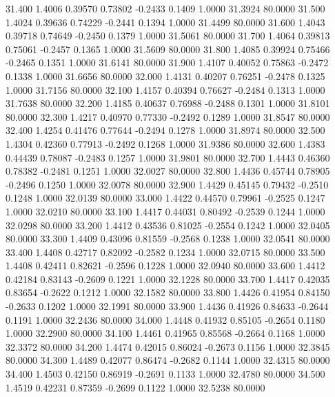   31.400   1.4006   0.39570   0.73802  -0.2433   0.1409   1.0000  31.3924  80.0000
  31.500   1.4024   0.39636   0.74229  -0.2441   0.1394   1.0000  31.4499  80.0000
  31.600   1.4043   0.39718   0.74649  -0.2450   0.1379   1.0000  31.5061  80.0000
  31.700   1.4064   0.39813   0.75061  -0.2457   0.1365   1.0000  31.5609  80.0000
  31.800   1.4085   0.39924   0.75466  -0.2465   0.1351   1.0000  31.6141  80.0000
  31.900   1.4107   0.40052   0.75863  -0.2472   0.1338   1.0000  31.6656  80.0000
  32.000   1.4131   0.40207   0.76251  -0.2478   0.1325   1.0000  31.7156  80.0000
  32.100   1.4157   0.40394   0.76627  -0.2484   0.1313   1.0000  31.7638  80.0000
  32.200   1.4185   0.40637   0.76988  -0.2488   0.1301   1.0000  31.8101  80.0000
  32.300   1.4217   0.40970   0.77330  -0.2492   0.1289   1.0000  31.8547  80.0000
  32.400   1.4254   0.41476   0.77644  -0.2494   0.1278   1.0000  31.8974  80.0000
  32.500   1.4304   0.42360   0.77913  -0.2492   0.1268   1.0000  31.9386  80.0000
  32.600   1.4383   0.44439   0.78087  -0.2483   0.1257   1.0000  31.9801  80.0000
  32.700   1.4443   0.46360   0.78382  -0.2481   0.1251   1.0000  32.0027  80.0000
  32.800   1.4436   0.45744   0.78905  -0.2496   0.1250   1.0000  32.0078  80.0000
  32.900   1.4429   0.45145   0.79432  -0.2510   0.1248   1.0000  32.0139  80.0000
  33.000   1.4422   0.44570   0.79961  -0.2525   0.1247   1.0000  32.0210  80.0000
  33.100   1.4417   0.44031   0.80492  -0.2539   0.1244   1.0000  32.0298  80.0000
  33.200   1.4412   0.43536   0.81025  -0.2554   0.1242   1.0000  32.0405  80.0000
  33.300   1.4409   0.43096   0.81559  -0.2568   0.1238   1.0000  32.0541  80.0000
  33.400   1.4408   0.42717   0.82092  -0.2582   0.1234   1.0000  32.0715  80.0000
  33.500   1.4408   0.42411   0.82621  -0.2596   0.1228   1.0000  32.0940  80.0000
  33.600   1.4412   0.42184   0.83143  -0.2609   0.1221   1.0000  32.1228  80.0000
  33.700   1.4417   0.42035   0.83654  -0.2622   0.1212   1.0000  32.1582  80.0000
  33.800   1.4426   0.41954   0.84150  -0.2633   0.1202   1.0000  32.1991  80.0000
  33.900   1.4436   0.41926   0.84633  -0.2644   0.1191   1.0000  32.2436  80.0000
  34.000   1.4448   0.41932   0.85105  -0.2654   0.1180   1.0000  32.2900  80.0000
  34.100   1.4461   0.41965   0.85568  -0.2664   0.1168   1.0000  32.3372  80.0000
  34.200   1.4474   0.42015   0.86024  -0.2673   0.1156   1.0000  32.3845  80.0000
  34.300   1.4489   0.42077   0.86474  -0.2682   0.1144   1.0000  32.4315  80.0000
  34.400   1.4503   0.42150   0.86919  -0.2691   0.1133   1.0000  32.4780  80.0000
  34.500   1.4519   0.42231   0.87359  -0.2699   0.1122   1.0000  32.5238  80.0000
